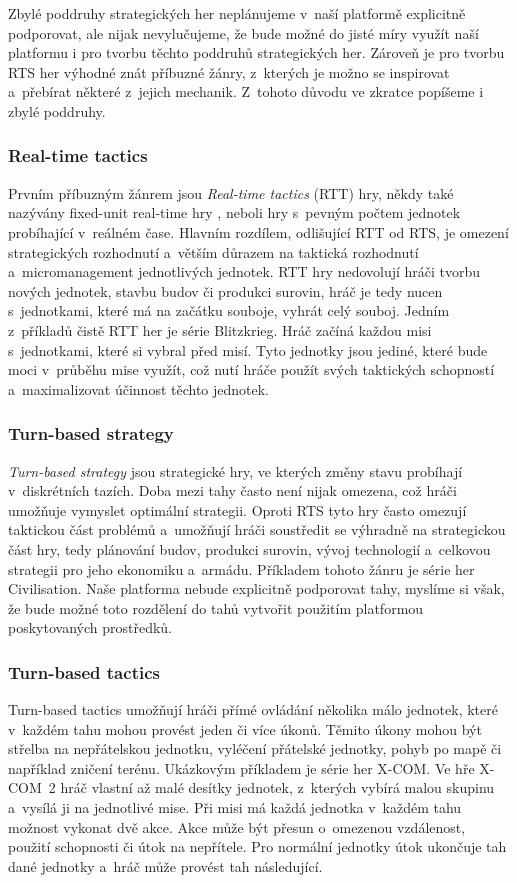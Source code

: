Zbylé poddruhy strategických her neplánujeme v~naší platformě explicitně podporovat, ale nijak nevylučujeme, že bude možné do jisté míry využít naší platformu i pro tvorbu těchto poddruhů strategických her. Zároveň je pro tvorbu RTS her výhodné znát příbuzné žánry, z~kterých je možno se inspirovat a~přebírat některé z~jejich mechanik. Z~tohoto důvodu ve zkratce popíšeme i zbylé poddruhy.

\subsubsection{Real-time tactics}
Prvním příbuzným žánrem jsou \emph{Real-time tactics} (RTT) hry, někdy také nazývány fixed-unit real-time hry \citep{site:stratg02}, neboli hry s~pevným počtem jednotek probíhající v~reálném čase. Hlavním rozdílem, odlišující RTT od RTS, je omezení  strategických rozhodnutí a~větším důrazem na taktická rozhodnutí a~micromanagement jednotlivých jednotek. RTT hry nedovolují hráči tvorbu nových jednotek, stavbu budov či produkci surovin, hráč je tedy nucen s~jednotkami, které má na začátku souboje, vyhrát celý souboj.  Jedním z~příkladů čistě RTT her je série Blitzkrieg\citep{site:blitzkrieg}. Hráč začíná každou misi s~jednotkami, které si vybral před misí. Tyto jednotky jsou jediné, které bude moci v~průběhu mise využít, což nutí hráče použít svých taktických schopností a~maximalizovat účinnost těchto jednotek. 

\subsubsection{Turn-based strategy}
\emph{Turn-based strategy} jsou strategické hry, ve kterých změny stavu probíhají v~diskrétních tazích. Doba mezi tahy často není nijak omezena, což hráči umožňuje vymyslet optimální strategii. Oproti RTS tyto hry často omezují taktickou část problémů a~umožňují hráči soustředit se výhradně na strategickou část hry, tedy plánování budov, produkci surovin, vývoj technologií a~celkovou strategii pro jeho ekonomiku a~armádu. Příkladem tohoto žánru je série her Civilisation\citep{site:civ5}. Naše platforma nebude explicitně podporovat tahy, myslíme si však, že bude možné toto rozdělení do tahů vytvořit použitím platformou poskytovaných prostředků.

\subsubsection{Turn-based tactics}
Turn-based tactics umožňují hráči přímé ovládání několika málo jednotek, které v~každém tahu mohou provést jeden či více úkonů. Těmito úkony mohou být střelba na nepřátelskou jednotku, vyléčení přátelské jednotky, pohyb po mapě či například zničení terénu. Ukázkovým příkladem je série her X-COM\citep{site:XCOM}. Ve hře X-COM~2 hráč vlastní až malé desítky jednotek, z~kterých vybírá malou skupinu a~vysílá ji na jednotlivé mise. Při misi má každá jednotka v~každém tahu možnost vykonat dvě akce. Akce může být přesun o~omezenou vzdálenost, použití schopnosti či útok na nepřítele. Pro normální jednotky útok ukončuje tah dané jednotky a~hráč může provést tah následující. 

